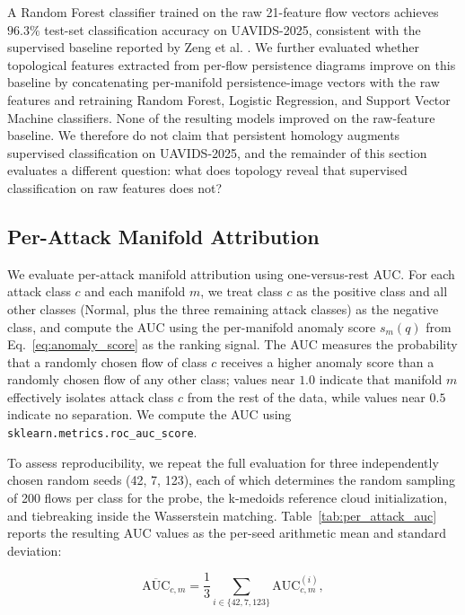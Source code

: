 \documentclass[conf]{new-aiaa}
\begin{document}
A Random Forest classifier trained on the raw 21-feature flow vectors achieves $96.3\%$ test-set classification accuracy on UAVIDS-2025, consistent with the supervised baseline reported by Zeng et al. \cite{Zeng}. We further evaluated whether topological features extracted from per-flow persistence diagrams improve on this baseline by concatenating per-manifold persistence-image vectors with the raw features and retraining Random Forest, Logistic Regression, and Support Vector Machine classifiers. None of the resulting models improved on the raw-feature baseline. We therefore do not claim that persistent homology augments supervised classification on UAVIDS-2025, and the remainder of this section evaluates a different question: what does topology reveal that supervised classification on raw features does not?

\subsection{Per-Attack Manifold Attribution}

We evaluate per-attack manifold attribution using one-versus-rest AUC. For each attack class $c$ and each manifold $m$, we treat class $c$ as the positive class and all other classes (Normal, plus the three remaining attack classes) as the negative class, and compute the AUC using the per-manifold anomaly score $s_m(q)$ from Eq.~\eqref{eq:anomaly_score} as the ranking signal. The AUC measures the probability that a randomly chosen flow of class $c$ receives a higher anomaly score than a randomly chosen flow of any other class; values near $1.0$ indicate that manifold $m$ effectively isolates attack class $c$ from the rest of the data, while values near $0.5$ indicate no separation. We compute the AUC using \texttt{sklearn.metrics.roc\_auc\_score}.

To assess reproducibility, we repeat the full evaluation for three independently chosen random seeds (42, 7, 123), each of which determines the random sampling of 200 flows per class for the probe, the k-medoids reference cloud initialization, and tiebreaking inside the Wasserstein matching. Table~\ref{tab:per_attack_auc} reports the resulting AUC values as the per-seed arithmetic mean and standard deviation:

\begin{equation}
\overline{\text{AUC}}_{c, m} = \frac{1}{3} \sum_{i \in \{42, 7, 123\}} \text{AUC}_{c, m}^{(i)},
\label{eq:auc_mean}
\end{equation}
\end{document}

